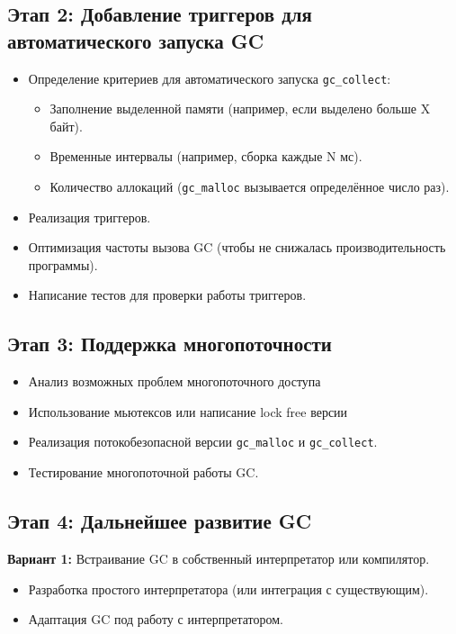 \subsection{Этап 2: Добавление триггеров для автоматического запуска GC}
\begin{itemize}
    \item Определение критериев для автоматического запуска \texttt{gc\_collect}:
    \begin{itemize}
        \item Заполнение выделенной памяти (например, если выделено больше X байт).
        \item Временные интервалы (например, сборка каждые N мс).
        \item Количество аллокаций (\texttt{gc\_malloc} вызывается определённое число раз).
    \end{itemize}
    \item Реализация триггеров.
    \item Оптимизация частоты вызова GC (чтобы не снижалась производительность программы).
    \item Написание тестов для проверки работы триггеров.
\end{itemize}

\subsection{Этап 3: Поддержка многопоточности}
\begin{itemize}
    \item Анализ возможных проблем многопоточного доступа
    \item Использование мьютексов или написание lock free версии
    \item Реализация потокобезопасной версии \texttt{gc\_malloc} и \texttt{gc\_collect}.
    \item Тестирование многопоточной работы GC.
\end{itemize}

\subsection{Этап 4: Дальнейшее развитие GC}
\textbf{Вариант 1:} Встраивание GC в собственный интерпретатор или компилятор.
\begin{itemize}
    \item Разработка простого интерпретатора (или интеграция с существующим).
    \item Адаптация GC под работу с интерпретатором.
\end{itemize}

